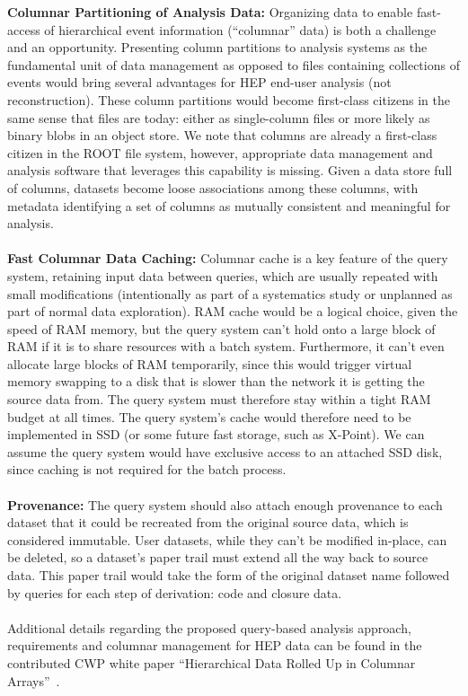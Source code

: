 \documentclass[12pt,a4paper]{article}
\begin{document}
{\bf Columnar Partitioning of Analysis Data:} Organizing data to enable fast-access of hierarchical event information (``columnar'' data) is both a challenge and an opportunity. Presenting column partitions to analysis systems as the fundamental unit of data management as opposed to files containing collections of events would bring several advantages for HEP end-user analysis (not reconstruction). These column partitions would become first-class citizens in the same sense that files are today: either as single-column files or more likely as binary blobs in an object store. We note that columns are already a first-class citizen in the ROOT file system, however, appropriate data management and analysis software that leverages this capability is missing. Given a data store full of columns, datasets become loose associations among these columns, with metadata identifying a set of columns as mutually consistent and meaningful for analysis.\\ \\
{\bf Fast Columnar Data Caching:} Columnar cache is a key feature of the query system, retaining input data between queries, which are usually repeated with small modifications (intentionally as part of a systematics study or unplanned as part of normal data exploration). RAM cache would be a logical choice, given the speed of RAM memory, but the query system can't hold onto a large block of RAM if it is to share resources with a batch system. Furthermore, it can't even allocate large blocks of RAM temporarily, since this would trigger virtual memory swapping to a disk that is slower than the network it is getting the source data from. The query system must therefore stay within a tight RAM budget at all times. The query system's cache would therefore need to be implemented in SSD (or some future fast storage, such as X-Point). We can assume the query system would have exclusive access to an attached SSD disk, since caching is not required for the batch process.\\ \\
{\bf Provenance:} The query system should also attach enough provenance to each dataset that it could be recreated from the original source data, which is considered immutable. User datasets, while they can't be modified in-place, can be deleted, so a dataset's paper trail must extend all the way back to source data. This paper trail would take the form of the original dataset name followed by queries for each step of derivation: code and closure data.\\ \\
Additional details regarding the proposed query-based analysis approach, requirements and columnar management for HEP data can be found in the contributed CWP white paper ``Hierarchical Data Rolled Up in Columnar Arrays''~\cite{Pivarski2017}. 
\end{document}
